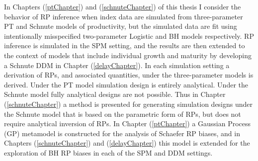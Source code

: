 \documentclass[12pt]{ucscthesis}
\begin{document}



In Chapters (\ref{ptChapter}) and (\ref{schnuteChapter}) of this thesis I 
consider the behavior of RP inference when index data are simulated from three-parameter 
PT and Schnute models of productivity, but the simulated data are fit using 
intentionally misspecified two-parameter Logistic and BH models respectively. 
%
RP inference is simulated in the SPM setting, and the 
results are then extended to the context of models that include individual 
growth and maturity by developing a Schnute DDM in Chapter (\ref{delayChapter}).
%
In each simulation setting a derivation of RPs, and associated quantities, 
under the three-parameter models is derived. %
Under the PT model simulation design is entirely analytical. Under the 
Schnute model fully analytical designs are not possible. Thus %
in Chapter (\ref{schnuteChapter}) a method is presented for generating simulation designs under the Schnute model 
that is based on the parametric form of RPs, but does not 
require analytical inversion of RPs. %
In Chapter (\ref{ptChapter}) a Gaussian Process (GP) metamodel \cite{gramacy_surrogates_2020, pourmohamad_bayesian_2021} 
is constructed for the analysis of Schaefer RP biases, and in Chapters (\ref{schnuteChapter}) 
and (\ref{delayChapter}) this model is extended for the exploration %
of BH RP biases in each of the SPM and DDM settings. %
\end{document}
